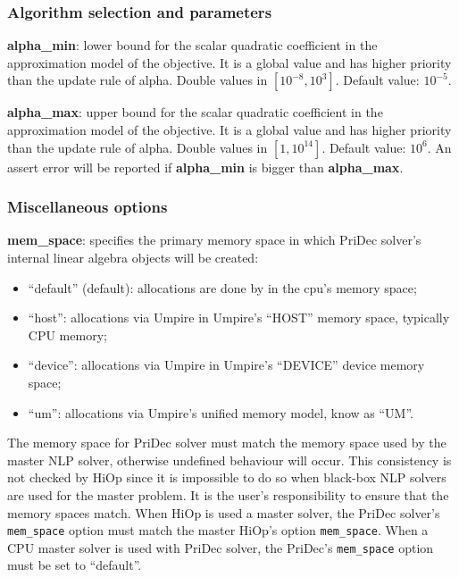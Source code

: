\subsubsection{Algorithm selection and parameters}
  \noindent \textbf{alpha\_min}: lower bound for the scalar quadratic coefficient in the approximation model of the objective. It is a global value and has higher priority than the update rule of alpha. Double values in $[10^{-8},10^3]$. Default value: $10^{-5}$.

  \medskip

  \noindent \textbf{alpha\_max}: upper bound for the scalar quadratic coefficient in the approximation model of the objective. It is a global value and has higher priority than the update rule of alpha. Double values in $[1,10^{14}]$. Default value: $10^6$. An assert error will be reported if \textbf{alpha\_min} is bigger than \textbf{alpha\_max}.
%

\subsubsection{Miscellaneous options}


\noindent \textbf{mem\_space}: specifies the primary memory space in which PriDec solver's internal linear algebra objects will be created:
\begin{itemize}
\item ``default'' (default): allocations are done by \Hi in the cpu's memory space;
\item ``host'':  allocations via Umpire in Umpire's ``HOST'' memory space, typically CPU memory;
\item ``device'': allocations via Umpire in Umpire's ``DEVICE'' device memory space;
\item ``um'': allocations via Umpire's unified memory model, know as ``UM''.
\end{itemize}
\warningcp{} The memory space for PriDec solver must match the memory space used by the master NLP solver, otherwise undefined behaviour will occur. This consistency is not checked by HiOp since it is impossible to do so when black-box NLP solvers are used for the master problem. It is the user's responsibility to ensure that the memory spaces match. When HiOp is used a master solver, the PriDec solver's \texttt{mem\_space} option must match the master HiOp's option \texttt{mem\_space}. When a CPU master solver is used with PriDec solver, the PriDec's \texttt{mem\_space} option must be set to ``default''.


